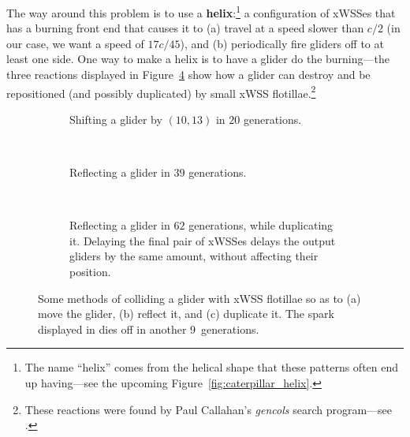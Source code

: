 The way around this problem is to use a \textbf{helix}:\footnote{The name ``helix'' comes from the helical shape that these patterns often end up having---see the upcoming Figure~\ref{fig:caterpillar_helix}.} a configuration of xWSSes that has a burning front end that causes it to (a) travel at a speed slower than $c/2$ (in our case, we want a speed of $17c/45$), and (b) periodically fire gliders off to at least one side. One way to make a helix is to have a glider do the burning---the three reactions displayed in Figure~\ref{fig:helix_operations} show how a glider can destroy and be repositioned (and possibly duplicated) by small xWSS flotillae.\footnote{These reactions were found by Paul Callahan's \emph{gencols} search program---see .}

\begin{figure}[!htb]
	\centering
	\begin{subfigure}[b]{0.475\textwidth}
		\centering
		\caption{Shifting a glider by $(10,13)$ in $20$ generations.}\label{fig:helix_shift}
	\end{subfigure} \quad \ \ \ \begin{subfigure}[b]{0.475\textwidth}
		\centering
		\caption{Reflecting a glider in $39$ generations.}\label{fig:helix_reflect}
	\end{subfigure}\\[0.3cm]
	\begin{subfigure}[b]{\textwidth}
		\centering
		\caption{Reflecting a glider in $62$ generations, while duplicating it. Delaying the final pair of xWSSes delays the output gliders by the same amount, without affecting their position.}\label{fig:helix_duplicate}
	\end{subfigure}
	\caption{Some methods of colliding a glider with xWSS flotillae so as to (a) move the glider, (b) reflect it, and (c) duplicate it. The spark displayed in  dies off in another 9~generations.}\label{fig:helix_operations}
\end{figure}

